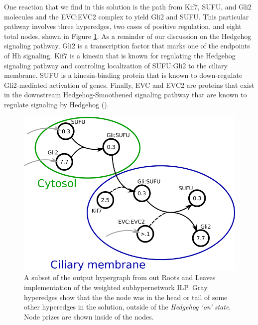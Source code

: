 \documentclass[12pt,twoside]{reedthesis}
\theoremstyle{definition}
\begin{document}
   One reaction that we find in this solution is the path from Kif7, SUFU, and Gli2 molecules and the EVC:EVC2 complex to yield Gli2 and SUFU. This particular pathway involves three hyperedges, two cases of positive regulation, and eight total nodes, shown in Figure \ref{fig:Hh-signaling-output}. As a reminder of our discussion on the Hedgehog signaling pathway, Gli2 is a transcription factor that marks one of the endpoints of Hh signaling. Kif7 is a kinesin that is known for regulating the Hedgehog signaling pathway and controling localization of SUFU:Gli2 to the ciliary membrane. SUFU is a kinesin-binding protein that is known to down-regulate Gli2-mediated activation of genes. Finally, EVC and EVC2 are proteins that exist in the downstream Hedgehog-Smoothened signaling pathway that are known to regulate signaling by Hedgehog (\cite{TheUniProtConsortium2014}).\par

    \begin{figure}[!h]
      \begin{center}
        \includegraphics[width=\textwidth]{Hh-signaling-output}
      \caption[B-connectivity.]{A subset of the output hypergraph from out Roots and Leaves implementation of the weighted subhypernetwork ILP. Gray hyperedges show that the the node was in the head or tail of some other hyperedges in the solution, outside of the \textit{Hedgehog `on' state}. Node prizes are shown inside of the nodes.}
      \label{fig:Hh-signaling-output}
      \end{center}
    \end{figure}
\end{document}
